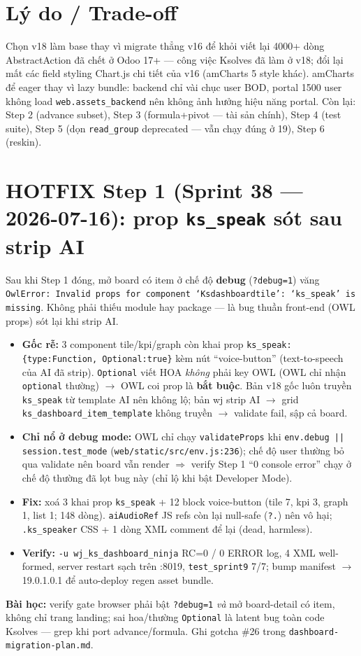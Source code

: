\section{Lý do / Trade-off}

Chọn v18 làm base thay vì migrate thẳng v16 để khỏi viết lại 4000+ dòng AbstractAction
đã chết ở Odoo 17+ --- công việc Ksolves đã làm ở v18; đổi lại mất các field styling
Chart.js chi tiết của v16 (amCharts 5 style khác). amCharts để eager thay vì lazy bundle:
backend chỉ vài chục user BOD, portal 1500 user không load
\texttt{web.assets\_backend} nên không ảnh hưởng hiệu năng portal. Còn lại: Step 2
(advance subset), Step 3 (formula+pivot --- tài sản chính), Step 4 (test suite),
Step 5 (dọn \texttt{read\_group} deprecated --- vẫn chạy đúng ở 19), Step 6 (reskin).

\section{HOTFIX Step 1 (Sprint 38 --- 2026-07-16): prop \texttt{ks\_speak} sót sau strip AI}

Sau khi Step 1 đóng, mở board có item ở chế độ \textbf{debug} (\texttt{?debug=1}) văng
\texttt{OwlError: Invalid props for component `Ksdashboardtile': `ks\_speak' is missing}.
Không phải thiếu module hay package --- là bug thuần front-end (OWL props) sót lại khi strip AI.

\begin{itemize}
  \item \textbf{Gốc rễ:} 3 component tile/kpi/graph còn khai prop
    \texttt{ks\_speak:\{type:Function, Optional:true\}} kèm nút ``voice-button'' (text-to-speech
    của AI đã strip). \texttt{Optional} viết HOA \emph{không} phải key OWL (OWL chỉ nhận
    \texttt{optional} thường) $\to$ OWL coi prop là \textbf{bắt buộc}. Bản v18 gốc luôn truyền
    \texttt{ks\_speak} từ template AI nên không lộ; bản wj strip AI $\to$ grid
    \texttt{ks\_dashboard\_item\_template} không truyền $\to$ validate fail, sập cả board.
  \item \textbf{Chỉ nổ ở debug mode:} OWL chỉ chạy \texttt{validateProps} khi
    \texttt{env.debug || session.test\_mode} (\texttt{web/static/src/env.js:236}); chế độ user
    thường bỏ qua validate nên board vẫn render $\Rightarrow$ verify Step 1 ``0 console error''
    chạy ở chế độ thường đã lọt bug này (chỉ lộ khi bật Developer Mode).
  \item \textbf{Fix:} xoá 3 khai prop \texttt{ks\_speak} + 12 block voice-button
    (tile 7, kpi 3, graph 1, list 1; 148 dòng). \texttt{aiAudioRef} JS refs còn lại null-safe
    (\texttt{?.}) nên vô hại; \texttt{.ks\_speaker} CSS + 1 dòng XML comment để lại (dead, harmless).
  \item \textbf{Verify:} \texttt{-u wj\_ks\_dashboard\_ninja} RC=0 / 0 ERROR log, 4 XML well-formed,
    server restart sạch trên :8019, \texttt{test\_sprint9} 7/7; bump manifest $\to$ 19.0.1.0.1
    để auto-deploy regen asset bundle.
\end{itemize}

\textbf{Bài học:} verify gate browser phải bật \texttt{?debug=1} \emph{và} mở board-detail có
item, không chỉ trang landing; sai hoa/thường \texttt{Optional} là latent bug toàn code
Ksolves --- grep khi port advance/formula. Ghi gotcha \#26 trong \texttt{dashboard-migration-plan.md}.
